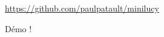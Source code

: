 \documentclass{beamer}
\begin{document}
\begin{frame}
   \centerline{\url{https://github.com/paulpatault/minilucy}}
   \thispagestyle{empty}
\end{frame}

\begin{frame}
   \centerline{Démo !}
   \thispagestyle{empty}
\end{frame}


\end{document}
